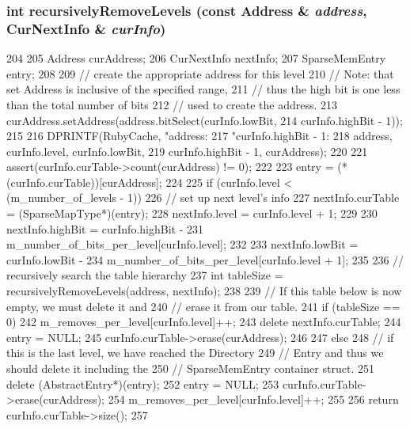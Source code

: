 \hypertarget{classSparseMemory_aa9e999fef6a14d51d503586d9723de5b}{
\subsubsection[{recursivelyRemoveLevels}]{\setlength{\rightskip}{0pt plus 5cm}int recursivelyRemoveLevels (const {\bf Address} \& {\em address}, \/  {\bf CurNextInfo} \& {\em curInfo})}}
\label{classSparseMemory_aa9e999fef6a14d51d503586d9723de5b}



\begin{DoxyCode}
204 {
205     Address curAddress;
206     CurNextInfo nextInfo;
207     SparseMemEntry entry;
208 
209     // create the appropriate address for this level
210     // Note: that set Address is inclusive of the specified range,
211     // thus the high bit is one less than the total number of bits
212     // used to create the address.
213     curAddress.setAddress(address.bitSelect(curInfo.lowBit,
214                                             curInfo.highBit - 1));
215 
216     DPRINTF(RubyCache, "address: %
217             "curInfo.highBit - 1: %
218             address, curInfo.level, curInfo.lowBit,
219             curInfo.highBit - 1, curAddress);
220 
221     assert(curInfo.curTable->count(curAddress) != 0);
222 
223     entry = (*(curInfo.curTable))[curAddress];
224 
225     if (curInfo.level < (m_number_of_levels - 1)) {
226         // set up next level's info
227         nextInfo.curTable = (SparseMapType*)(entry);
228         nextInfo.level = curInfo.level + 1;
229 
230         nextInfo.highBit = curInfo.highBit -
231             m_number_of_bits_per_level[curInfo.level];
232 
233         nextInfo.lowBit = curInfo.lowBit -
234             m_number_of_bits_per_level[curInfo.level + 1];
235 
236         // recursively search the table hierarchy
237         int tableSize = recursivelyRemoveLevels(address, nextInfo);
238 
239         // If this table below is now empty, we must delete it and
240         // erase it from our table.
241         if (tableSize == 0) {
242             m_removes_per_level[curInfo.level]++;
243             delete nextInfo.curTable;
244             entry = NULL;
245             curInfo.curTable->erase(curAddress);
246         }
247     } else {
248         // if this is the last level, we have reached the Directory
249         // Entry and thus we should delete it including the
250         // SparseMemEntry container struct.
251         delete (AbstractEntry*)(entry);
252         entry = NULL;
253         curInfo.curTable->erase(curAddress);
254         m_removes_per_level[curInfo.level]++;
255     }
256     return curInfo.curTable->size();
257 }
\end{DoxyCode}
